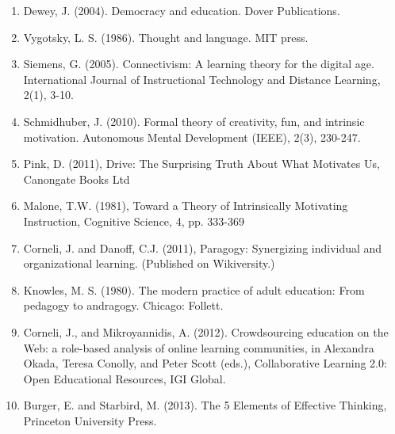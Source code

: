 \begin{enumerate}
\item
  Dewey, J. (2004). Democracy and education. Dover Publications.
\item
  Vygotsky, L. S. (1986). Thought and language. MIT press.
\item
  Siemens, G. (2005). Connectivism: A learning theory for the digital
  age. International Journal of Instructional Technology and Distance
  Learning, 2(1), 3-10.
\item
  Schmidhuber, J. (2010). Formal theory of creativity, fun, and
  intrinsic motivation. Autonomous Mental Development (IEEE), 2(3),
  230-247.
\item
  Pink, D. (2011), Drive: The Surprising Truth About What Motivates Us,
  Canongate Books Ltd
\item
  Malone, T.W. (1981), Toward a Theory of Intrinsically Motivating
  Instruction, Cognitive Science, 4, pp. 333-369
\item
  Corneli, J. and Danoff, C.J. (2011), Paragogy: Synergizing individual
  and organizational learning. (Published on Wikiversity.)
\item
  Knowles, M. S. (1980). The modern practice of adult education: From
  pedagogy to andragogy. Chicago: Follett.
\item
  Corneli, J., and Mikroyannidis, A. (2012). Crowdsourcing education on
  the Web: a role-based analysis of online learning communities, in
  Alexandra Okada, Teresa Conolly, and Peter Scott (eds.), Collaborative
  Learning 2.0: Open Educational Resources, IGI Global.
\item
  Burger, E. and Starbird, M. (2013). The 5 Elements of Effective
  Thinking, Princeton University Press.
\end{enumerate}
